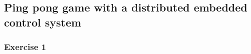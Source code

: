\subsection*{Ping pong game with a distributed embedded control system}

\subsubsection*{Exercise 1}